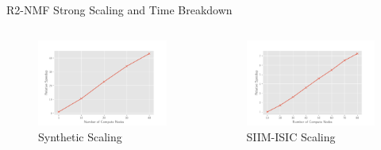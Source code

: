 \documentclass{beamer}
\newcommand{\image}{SIIM-ISIC}
\begin{document}
\begin{frame}{R2-NMF Strong Scaling and Time Breakdown}
    \centering
    \begin{columns}
        \begin{column}{0.5\textwidth}
            \begin{figure}
            \includegraphics[width=\figscal]{../plots/synthetic_rank2_speedup.pdf}
            \caption{Synthetic Scaling}
            \end{figure}
        \end{column}
        \begin{column}{0.5\textwidth}
            \begin{figure}
            \includegraphics[width=\figscal]{../plots/realworld_rank2_speedup.pdf}
            \caption{\image{} Scaling}
            \end{figure}
        \end{column}

\end{columns}
\end{frame}
\end{document}
